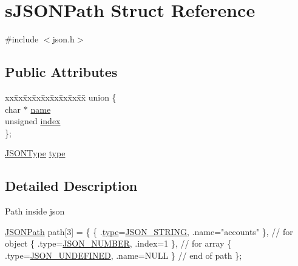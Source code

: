 \hypertarget{structsJSONPath}{}\section{s\+J\+S\+O\+N\+Path Struct Reference}
\label{structsJSONPath}


{\ttfamily \#include $<$json.\+h$>$}

\subsection*{Public Attributes}
\begin{DoxyCompactItemize}
\item 
\begin{tabbing}
xx\=xx\=xx\=xx\=xx\=xx\=xx\=xx\=xx\=\kill
union \{\\
\>char $\ast$ \hyperlink{structsJSONPath_a7fa6192b5aea8f8f69c3a3f668129f63}{name}\\
\>unsigned \hyperlink{structsJSONPath_a0828364e7d45bd1bcca8f21b659596aa}{index}\\
\}; \hypertarget{structsJSONPath_aeed98000cbdb9665e249e21c49a6aa7a}{}\label{structsJSONPath_aeed98000cbdb9665e249e21c49a6aa7a}
\\

\end{tabbing}\item 
\hyperlink{json_8h_af761d54284482a1af5a01d8f52845b49}{J\+S\+O\+N\+Type} \hyperlink{structsJSONPath_a6c4879fb81a51a713dc7867761e3b295}{type}
\end{DoxyCompactItemize}


\subsection{Detailed Description}
Path inside json


\begin{DoxyCode}
\hyperlink{structsJSONPath}{JSONPath} path[3] = \{
    \{ .\hyperlink{structsJSONPath_a6c4879fb81a51a713dc7867761e3b295}{type}=\hyperlink{json_8h_acab6725e93cbfcfcf4273259977127a1a02bfd03b07e5b9ecd6ee0d257dc37daf}{JSON\_STRING}, .name=\textcolor{stringliteral}{"accounts"} \}, \textcolor{comment}{// for object}
    \{ .type=\hyperlink{json_8h_acab6725e93cbfcfcf4273259977127a1a6670b3c9b7ba8ab3976a7521edcc7f97}{JSON\_NUMBER}, .index=1 \}, \textcolor{comment}{// for array}
    \{ .type=\hyperlink{json_8h_acab6725e93cbfcfcf4273259977127a1aef1b2fb1bcc9012effaae713daf7b458}{JSON\_UNDEFINED}, .name=NULL \} \textcolor{comment}{// end of path}
\};
\end{DoxyCode}


